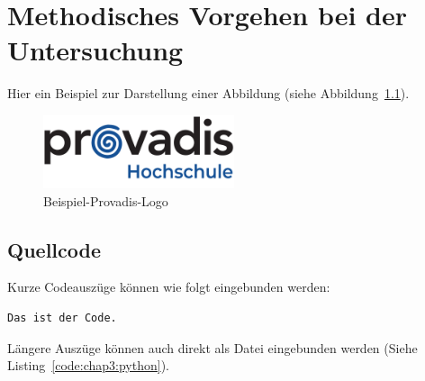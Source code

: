 %

\chapter{Methodisches Vorgehen bei der Untersuchung}

Hier ein Beispiel zur Darstellung einer Abbildung (siehe Abbildung~\ref{fig:chap3:provadis}).

\begin{figure}[htb]
\centering
\includegraphics[width=0.5\textwidth]{Bilder/Deckblatt/provadis-hochschule.pdf}
\caption{Beispiel-Provadis-Logo}
\label{fig:chap3:provadis}
\end{figure}

\section{Quellcode}
Kurze Codeauszüge können wie folgt eingebunden werden:

\begin{lstlisting}
Das ist der Code.
\end{lstlisting}

Längere Auszüge können auch direkt als Datei eingebunden werden (Siehe Listing~\ref{code:chap3:python}).


